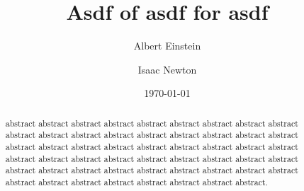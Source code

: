 \documentclass[dvipdfmx,twocolumn,preprintnumbers,superscriptaddress,nofootinbib]{revtex4-2}
\begin{document}
\title{Asdf of asdf for asdf}

\author{Albert Einstein}

\author{Isaac Newton}

\date{\today}

\begin{abstract}
    abstract abstract abstract abstract abstract abstract abstract abstract abstract abstract abstract abstract abstract abstract abstract abstract abstract abstract abstract abstract abstract abstract abstract abstract abstract abstract abstract abstract abstract abstract abstract abstract abstract abstract abstract abstract abstract abstract abstract abstract abstract abstract abstract abstract abstract abstract abstract abstract abstract abstract abstract abstract abstract.
\end{abstract}


\maketitle




\newpage


\newpage

\end{document}
